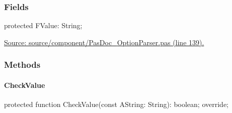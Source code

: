 \documentclass{report}
\newif\ifpdf
\begin{document}
\subsubsection*{\large{\textbf{Fields}}\normalsize\hspace{1ex}\hfill}
\begin{list}{}{
\setlength{\itemindent}{0cm}
\setlength{\listparindent}{0cm}
\setlength{\leftmargin}{\evensidemargin}
\addtolength{\leftmargin}{\tmplength}
\settowidth{\labelsep}{X}
\addtolength{\leftmargin}{\labelsep}
\setlength{\labelwidth}{\tmplength}
}
\label{PasDoc_OptionParser.TStringOption-FValue}
\item[\textbf{FValue}\hfill]
\ifpdf
\begin{flushleft}
\fi
\begin{ttfamily}
protected FValue: String;\end{ttfamily}

\ifpdf
\end{flushleft}
\fi


\par  \par
\href{https://github.com/pasdoc/pasdoc/blob/master/source/component/PasDoc_OptionParser.pas#L139}{Source: source/component/PasDoc{\_}OptionParser.pas (line 139).}\end{list}
\subsubsection*{\large{\textbf{Methods}}\normalsize\hspace{1ex}\hfill}
\paragraph*{CheckValue}\hspace*{\fill}

\label{PasDoc_OptionParser.TStringOption-CheckValue}
\begin{list}{}{
\setlength{\itemindent}{0cm}
\setlength{\listparindent}{0cm}
\setlength{\leftmargin}{\evensidemargin}
\addtolength{\leftmargin}{\tmplength}
\settowidth{\labelsep}{X}
\addtolength{\leftmargin}{\labelsep}
\setlength{\labelwidth}{\tmplength}
}
\item[\textbf{Declaration}\hfill]
\ifpdf
\begin{flushleft}
\fi
\begin{ttfamily}
protected function CheckValue(const AString: String): boolean; override;\end{ttfamily}

\ifpdf
\end{flushleft}
\fi

\end{list}
\ifpdf
\end{document}
